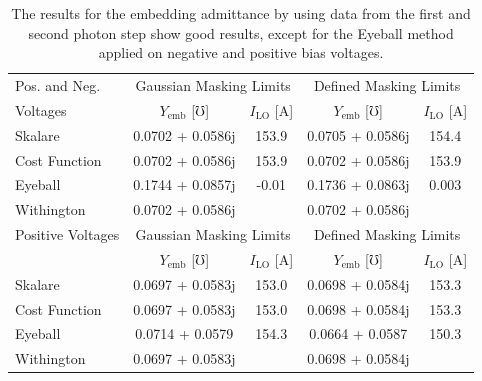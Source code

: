 \documentclass[]{article}
\begin{document}
\begin{table}[]
	\centering
	\renewcommand{\arraystretch}{1.5}
	\begin{tabular}{l|cc|cc}\hline
		Pos. and Neg. & \multicolumn{2}{c|}{Gaussian Masking Limits} & \multicolumn{2}{c}{Defined Masking Limits} \\
		Voltages & $Y_\text{emb}$ [$\mho$] & $I_\text{LO}$ [\textmu A] & $Y_\text{emb}$ [$\mho$] & $I_\text{LO}$ [\textmu A] \\\hline
		Skalare & 0.0702 + 0.0586j & 153.9 & 0.0705 + 0.0586j & 154.4 \\
		Cost Function & 0.0702 + 0.0586j & 153.9 & 0.0702 + 0.0586j & 153.9 \\
		Eyeball & 0.1744 + 0.0857j & -0.01 & 0.1736 + 0.0863j & 0.003 \\
		Withington & 0.0702 + 0.0586j &  & 0.0702 + 0.0586j &  \\\hline
		Positive Voltages & \multicolumn{2}{c|}{Gaussian Masking Limits} & \multicolumn{2}{c}{Defined Masking Limits} \\
		& $Y_\text{emb}$ [$\mho$] & $I_\text{LO}$ [\textmu A] & $Y_\text{emb}$ [$\mho$] & $I_\text{LO}$ [\textmu A] \\\hline
		Skalare & 0.0697 + 0.0583j & 153.0 & 0.0698 + 0.0584j & 153.3 \\
		Cost Function & 0.0697 + 0.0583j & 153.0 & 0.0698 + 0.0584j & 153.3 \\
		Eyeball & 0.0714 + 0.0579 & 154.3 & 0.0664 + 0.0587 & 150.3 \\
		Withington & 0.0697 + 0.0583j &  & 0.0698 + 0.0584j & 
	\end{tabular}
	\caption{The results for the embedding admittance by using data from the first and second photon step show good results, except for the Eyeball method applied on negative and positive bias voltages.}
	\label{tab:yEmb2Steps}
\end{table}
\end{document}

